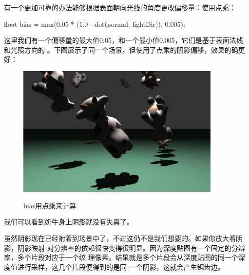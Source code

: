 \documentclass{article}
\begin{document}
	有一个更加可靠的办法能够根据表面朝向光线的角度更改偏移量：使用点乘：
	\begin{framed}
		float bias = max(0.05 * (1.0 - dot(normal, lightDir)), 0.005);
	\end{framed}
	这里我们有一个偏移量的最大值0.05，和一个最小值0.005，它们是基于表面法线和光照方向的
	。下图展示了同一个场景，但使用了点乘的阴影偏移，效果的确更好：
	\begin{figure}[htb]
		\caption{\label{table.label} bias用点乘来计算} \centering
		\begin{center}
			\includegraphics[width=4in]{shadow3.jpg}
			\label{figure.label}
		\end{center}
	\end{figure}

	我们可以看到奶牛身上阴影就没有失真了。
	
	虽然阴影现在已经附着到场景中了，不过这仍不是我们想要的。如果你放大看阴影，阴影映射
	对分辨率的依赖很快变得很明显。因为深度贴图有一个固定的分辨率，多个片段对应于一个纹
	理像素。结果就是多个片段会从深度贴图的同一个深度值进行采样，这几个片段便得到的是同
	一个阴影，这就会产生锯齿边。
	
\end{document}
